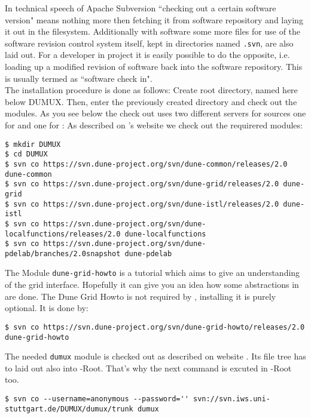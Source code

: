 In technical speech of Apache Subversion ``checking out a certain software version" means nothing more then fetching 
it from software repository and laying it out in the filesystem.  Additionally with software some more files for use of the software revision control system itself, kept in directories named \texttt{.svn}, are also laid out.
For a developer in \Dumux project it is easily possible to do the opposite, i.e. loading up a modified revision of software back into the software repository. This is usually termed as ``software check in".\\

The installation procedure is done as follows:
Create {\Dune} root directory, named here below DUMUX.
Then, enter the previously created directory and check out the modules. 
As you see below the check out uses two different servers for sources one for \Dune and one for {\Dumux}:
As described on \Dune's website \cite{DUNE-DOWNLOAD-SVN} we check out the requirered \Dune modules:

\begin{lstlisting}[style=Bash]
$ mkdir DUMUX
$ cd DUMUX
$ svn co https://svn.dune-project.org/svn/dune-common/releases/2.0 dune-common
$ svn co https://svn.dune-project.org/svn/dune-grid/releases/2.0 dune-grid
$ svn co https://svn.dune-project.org/svn/dune-istl/releases/2.0 dune-istl
$ svn co https://svn.dune-project.org/svn/dune-localfunctions/releases/2.0 dune-localfunctions
$ svn co https://svn.dune-project.org/svn/dune-pdelab/branches/2.0snapshot dune-pdelab
\end{lstlisting}

The Module \texttt{dune-grid-howto} is a tutorial which aims to give an understanding of the \Dune grid interface.
Hopefully it can give you an idea how some abstractions in \Dune are done.
The Dune Grid Howto is not required by \Dumux, installing it is purely optional. It is done by: 

\begin{lstlisting}[style=Bash]
$ svn co https://svn.dune-project.org/svn/dune-grid-howto/releases/2.0 dune-grid-howto
\end{lstlisting}

The needed \texttt{dumux} module is checked out as described on \Dumux website \cite{DUMUX-HP}.
Its file tree has to laid out also into \Dune-Root. That's why the next command
is excuted in \Dune-Root too.

\begin{lstlisting}[style=Bash]
$ svn co --username=anonymous --password='' svn://svn.iws.uni-stuttgart.de/DUMUX/dumux/trunk dumux
\end{lstlisting}

